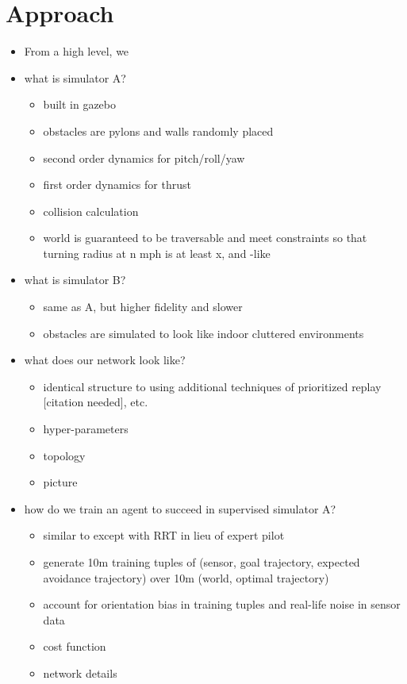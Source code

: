 \documentclass[paper=a4, fontsize=11pt]{scrartcl} %
\begin{document}
\section{Approach} 
\begin{itemize}
	\item From a high level, we 
\end{itemize}

\begin{itemize}
	\item what is simulator A?
	\begin{itemize}
		\item built in gazebo
		\item obstacles are pylons and walls randomly placed
		\item second order dynamics for pitch/roll/yaw
		\item first order dynamics for thrust
		\item collision calculation
		\item world is guaranteed to be traversable and meet constraints so that turning radius at n mph is at least x, and \cite{Richter2014}-like 
	\end{itemize}

	\item what is simulator B?
	\begin{itemize}
		\item same as A, but higher fidelity and slower
		\item obstacles are simulated to look like indoor cluttered environments
	\end{itemize}

	\item what does our network look like?
	\begin{itemize}
		\item identical structure to \cite{Lillicrap2015} using additional techniques of prioritized replay [citation needed], etc.
		\item hyper-parameters
		\item topology
		\item picture
	\end{itemize}

	\item how do we train an agent to succeed in supervised simulator A?
	\begin{itemize}
		\item similar to \cite{Kim2015} except with RRT in lieu of expert pilot 
		\item generate 10m training tuples of (sensor, goal trajectory, expected avoidance trajectory) over 10m (world, optimal trajectory)
		\item account for orientation bias in training tuples and real-life noise in sensor data
		\item cost function
		\item network details
	\end{itemize}


\end{itemize}
\end{document}
